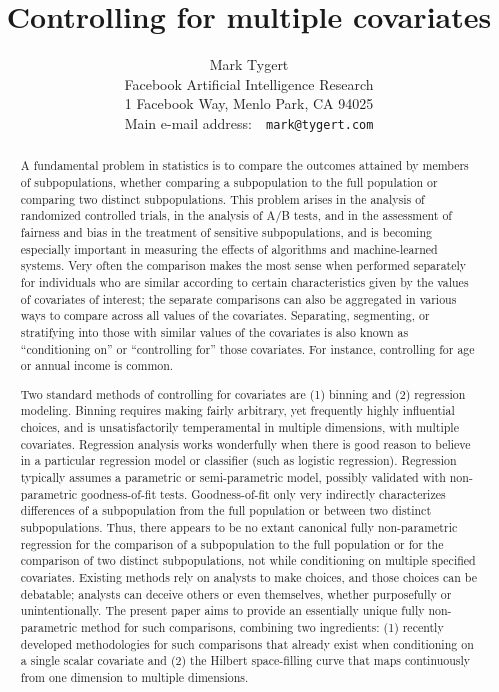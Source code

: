 \documentclass{article}
\title{Controlling for multiple covariates}
\author{Mark Tygert\\{\normalsize Facebook Artificial Intelligence Research}\\
{\normalsize 1 Facebook Way, Menlo Park, CA 94025}\\
{\normalsize Main e-mail address:\ \ {\tt mark@tygert.com}}}
\begin{document}
\maketitle



\begin{abstract}
A fundamental problem in statistics is to compare
the outcomes attained by members of subpopulations,
whether comparing a subpopulation to the full population
or comparing two distinct subpopulations.
This problem arises in the analysis of randomized controlled trials,
in the analysis of A/B tests, and in the assessment of fairness and bias
in the treatment of sensitive subpopulations,
and is becoming especially important in measuring the effects
of algorithms and machine-learned systems.
Very often the comparison makes the most sense when performed
separately for individuals who are similar according to certain characteristics
given by the values of covariates of interest;
the separate comparisons can also be aggregated in various ways
to compare across all values of the covariates.
Separating, segmenting, or stratifying into those with similar values
of the covariates is also known as ``conditioning on'' or ``controlling for''
those covariates.
For instance, controlling for age or annual income is common.

Two standard methods of controlling for covariates are (1) binning
and (2) regression modeling.
Binning requires making fairly arbitrary, yet frequently highly influential
choices, and is unsatisfactorily temperamental in multiple dimensions,
with multiple covariates.
Regression analysis works wonderfully when there is good reason to believe
in a particular regression model or classifier (such as logistic regression).
Regression typically assumes a parametric or semi-parametric model,
possibly validated with non-parametric goodness-of-fit tests.
Goodness-of-fit only very indirectly characterizes differences
of a subpopulation from the full population
or between two distinct subpopulations.
Thus, there appears to be no extant canonical fully non-parametric regression
for the comparison of a subpopulation to the full population
or for the comparison of two distinct subpopulations,
not while conditioning on multiple specified covariates.
Existing methods rely on analysts to make choices,
and those choices can be debatable;
analysts can deceive others or even themselves,
whether purposefully or unintentionally.
The present paper aims to provide
an essentially unique fully non-parametric method
for such comparisons, combining two ingredients:
(1) recently developed methodologies for such comparisons
that already exist when conditioning on a single scalar covariate and
(2) the Hilbert space-filling curve that maps continuously
from one dimension to multiple dimensions.
\end{abstract}
\end{document}
